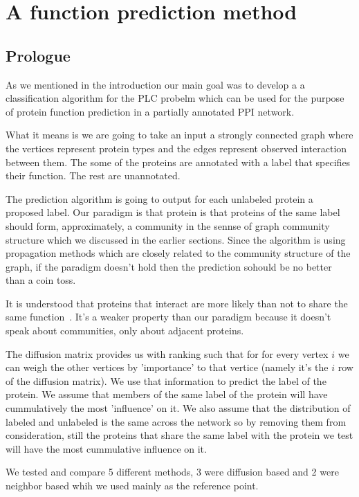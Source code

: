 \section{A function prediction method}
\subsection*{Prologue}
As we mentioned in the introduction our main goal was to develop a
a classification algorithm for the PLC probelm which can be used for the
purpose of protein function prediction in a partially annotated PPI
network.

What it means is we are going to take an input a strongly connected
graph where the vertices represent protein types and the edges represent
observed interaction between them. The some of the proteins are
annotated with a label that specifies their function. The rest are
unannotated.

The prediction algorithm is going to output for each unlabeled protein a
proposed label. Our paradigm is that protein is that proteins of the
same label should form, approximately, a community in the sennse of
graph community structure which we discussed in the earlier sections.
Since the algorithm is using propagation methods which are closely
related to the community structure of the graph, if the paradigm doesn't
hold then the prediction sohould be no better than a coin toss.

It is understood that proteins that interact are more likely than not to
share the same function~\cite{schwikowski2000network}. It's a weaker
property than our paradigm because it doesn't speak about communities,
only about adjacent proteins.

The diffusion matrix provides us with ranking such that for for every
vertex $i$ we can weigh the other vertices by 'importance' to that
vertice (namely it's the $i$ row of the diffusion matrix). We use that
information to predict the label of the protein. We assume that members
of the same label of the protein will have cummulatively the most
'influence' on it. We also assume that the distribution of labeled and
unlabeled is the same across the network so by removing them from
consideration, still the proteins that share the same label with the
protein we test will have the most cummulative influence on it.

We tested and compare 5 different methods, 3 were diffusion based and 2
were neighbor based whih we used mainly as the reference point.

